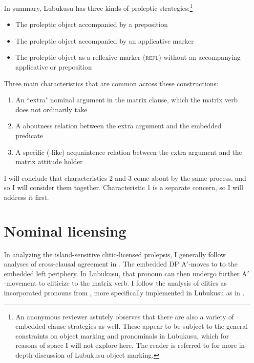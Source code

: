 \documentclass[output=paper,colorlinks,citecolor=brown]{langscibook}
\begin{document}
In summary, Lubukusu has three kinds of proleptic strategies:\footnote{An anonymous reviewer astutely observes that there are also a variety of embedded-clause strategies as well. These appear to be subject to the general constraints on object marking and pronominals in Lubukusu, which for reasons of space I will not explore here. The reader is referred to \citet{SikukuEtAl2018} for more in-depth discussion of Lubukusu object marking.}

\begin{itemize}
	\item The proleptic object accompanied by a preposition
	\item The proleptic object accompanied by an applicative marker
	\item The proleptic object as a reflexive marker (\textsc{refl}) without an accompanying applicative or preposition
\end{itemize}

Three main characteristics that are common across these constructions:

\begin{enumerate}
	\item An ``extra" nominal argument in the matrix clause, which the matrix verb does not ordinarily take
	\item A aboutness relation between the extra argument and the embedded predicate
	\item A specific (-like) acquaintence relation between the extra argument and the matrix attitude holder
\end{enumerate}

I will conclude that characteristics 2 and 3 come about by the same process, and so I will consider them together. Characteristic 1 is a separate concern, so I will address it first.

\section{Nominal licensing}\label{sec:newkirk:3}

In analyzing the island-sensitive clitic-licensed prolepsis, I generally follow analyses of cross-clausal agreement in \citet{PolinskyPotsdam2001, Bruening2001, BraniganMacKenzie2002}. The embedded DP A$'$-moves to to the embedded left periphery. In Lubukusu, that pronoun can then undergo further A$'$-movement to cliticize to the matrix verb. I follow the analysis of clitics as incorporated pronouns from \citet{Matushansky2006, BakerKramer2016}, more specifically implemented in Lubukusu as in \citet{SikukuEtAl2018}.
\end{document}
